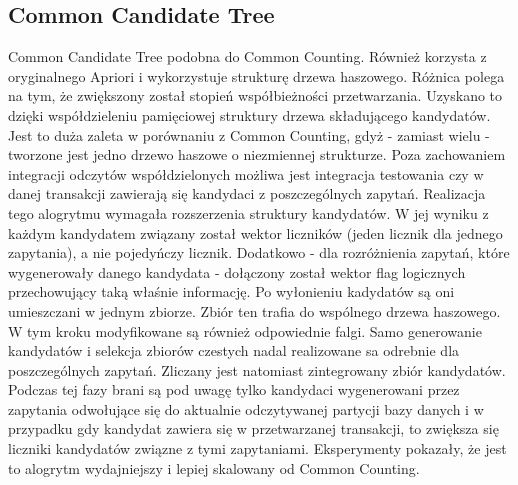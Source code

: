 \subsection{Common Candidate Tree \cite{WojciechowskiCCT}}
\label{c326}
Common Candidate Tree podobna do Common Counting. Również korzysta z oryginalnego Apriori i wykorzystuje strukturę drzewa haszowego. Różnica polega na tym, że zwiększony został stopień współbieżności przetwarzania. Uzyskano to dzięki współdzieleniu pamięciowej struktury drzewa składującego kandydatów. Jest to duża zaleta w porównaniu z Common Counting, gdyż - zamiast wielu - tworzone jest jedno drzewo haszowe o niezmiennej strukturze. Poza zachowaniem integracji odczytów współdzielonych możliwa jest integracja testowania czy w danej transakcji zawierają się kandydaci z poszczególnych zapytań. Realizacja tego alogrytmu wymagała rozszerzenia struktury kandydatów. W jej wyniku z każdym kandydatem związany został wektor liczników (jeden licznik dla jednego zapytania), a nie pojedyńczy licznik. Dodatkowo - dla rozróżnienia zapytań, które wygenerowały danego kandydata - dołączony został wektor flag logicznych przechowujący taką właśnie informację. Po wyłonieniu kadydatów są oni umieszczani w jednym zbiorze. Zbiór ten trafia do wspólnego drzewa haszowego. W tym kroku modyfikowane są również odpowiednie falgi. Samo generowanie kandydatów i selekcja zbiorów czestych nadal realizowane sa odrebnie dla poszczególnych zapytań. Zliczany jest natomiast zintegrowany zbiór kandydatów. Podczas tej fazy brani są pod uwagę tylko kandydaci wygenerowani przez zapytania odwołujące się do aktualnie odczytywanej partycji bazy danych i w przypadku gdy kandydat zawiera się w przetwarzanej transakcji, to zwiększa się liczniki kandydatów związne z tymi zapytaniami.
Eksperymenty \cite{WojciechwskiCCT} pokazały, że jest to alogrytm wydajniejszy i lepiej skalowany od Common Counting.